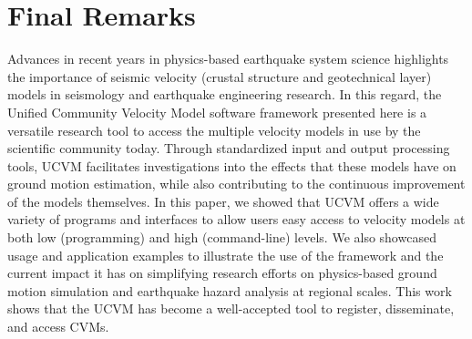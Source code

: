 
\section{Final Remarks}

Advances in recent years in physics-based earthquake system science highlights the importance of seismic velocity (crustal structure and geotechnical layer) models in seismology and earthquake engineering research. In this regard, the Unified Community Velocity Model software framework presented here is a versatile research tool to access the multiple velocity models in use by the scientific community today. Through standardized input and output processing tools, UCVM facilitates investigations into the effects that these models have on ground motion estimation, while also contributing to the continuous improvement of the models themselves. In this paper, we showed that UCVM offers a wide variety of programs and interfaces to allow users easy access to velocity models at both low (programming) and high (command-line) levels. We also showcased usage and application examples to illustrate the use of the framework and the current impact it has on simplifying research efforts on physics-based ground motion simulation and earthquake hazard analysis at regional scales. This work shows that the UCVM has become a well-accepted tool to register, disseminate, and access CVMs.
